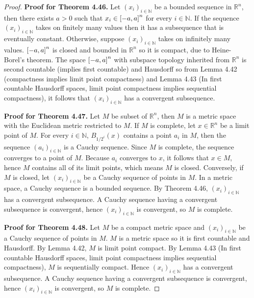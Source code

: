 \begin{proof}
	\textbf{Proof for Theorem 4.46.} Let ${(x_{i})}_{i\in\mathbb{N}}$ be a bounded sequence in $\mathbb{R}^{n}$, then there exists $a > 0$ such that $x_{i} \in {\left[{-a, a}\right]}^{n}$ for every $i\in\mathbb{N}$. If the sequence ${(x_{i})}_{i\in\mathbb{N}}$ takes on finitely many values then it has a subsequence that is eventually constant. Otherwise, suppose ${(x_{i})}_{i\in\mathbb{N}}$ takes on infinitely many values. ${\left[{-a, a}\right]}^{n}$ is closed and bounded in $\mathbb{R}^{n}$ so it is compact, due to Heine-Borel's theorem. The space ${\left[{-a, a}\right]}^{n}$ with subspace topology inherited from $\mathbb{R}^{n}$ is second countable (implies first countable) and Hausdorff so from Lemma 4.42 (compactness implies limit point compactness) and Lemma 4.43 (In first countable Hausdorff spaces, limit point compactness implies sequential compactness), it follows that ${(x_{i})}_{i\in\mathbb{N}}$ has a convergent subsequence.

	\textbf{Proof for Theorem 4.47.} Let $M$ be subset of $\mathbb{R}^{n}$, then $M$ is a metric space with the Euclidean metric restricted to $M$. If $M$ is complete, let $x\in \mathbb{R}^{n}$ be a limit point of $M$. For every $i\in\mathbb{N}$, $B_{1/2^{i}}(x)$ contains a point $a_{i}$ in $M$, then the sequence ${(a_{i})}_{i\in\mathbb{N}}$ is a Cauchy sequence. Since $M$ is complete, the sequence converges to a point of $M$. Because $a_{i}$ converges to $x$, it follows that $x\in M$, hence $M$ contains all of its limit points, which means $M$ is closed. Conversely, if $M$ is closed, let ${(x_{i})}_{i\in\mathbb{N}}$ be a Cauchy sequence of points in $M$. In a metric space, a Cauchy sequence is a bounded sequence. By Theorem 4.46, ${(x_{i})}_{i\in\mathbb{N}}$ has a convergent subsequence. A Cauchy sequence having a convergent subsequence is convergent, hence ${(x_{i})}_{i\in\mathbb{N}}$ is convergent, so $M$ is complete.

	\textbf{Proof for Theorem 4.48.} Let $M$ be a compact metric space and ${(x_{i})}_{i\in\mathbb{N}}$ be a Cauchy sequence of points in $M$. $M$ is a metric space so it is first countable and Hausdorff. By Lemma 4.42, $M$ is limit point compact. By Lemma 4.43 (In first countable Hausdorff spaces, limit point compactness implies sequential compactness), $M$ is sequentially compact. Hence ${(x_{i})}_{i\in\mathbb{N}}$ has a convergent subsequence. A Cauchy sequence having a convergent subsequence is convergent, hence ${(x_{i})}_{i\in\mathbb{N}}$ is convergent, so $M$ is complete.
\end{proof}

